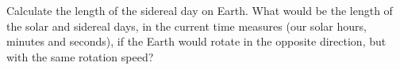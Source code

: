 Calculate the length of the sidereal day on Earth. What would be the length of
the solar and sidereal days, in the current time measures (our solar hours,
minutes and seconds), if the Earth would rotate in the opposite direction, but
with the same rotation speed?

